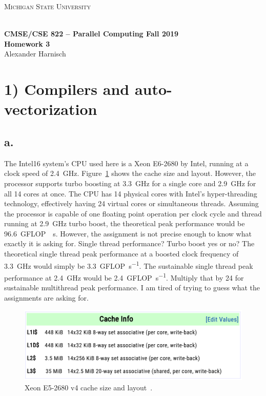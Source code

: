 \documentclass[a4paper, 11pt]{article}
\begin{document}
\noindent
\centerline{\small{\textsc{Michigan State University}}} \\
\large{\textbf{CMSE/CSE 822 – Parallel Computing \hfill Fall 2019 \\
Homework 3}} \\
Alexander Harnisch \\
\noindent\makebox[\linewidth]{\rule{\textwidth}{0.4pt}}

\section*{1) Compilers and auto-vectorization}
\subsection*{a.}
\label{sec:1a}
The Intel16 system's CPU used here is a Xeon E6-2680 by Intel, running at a
clock speed of \SI{2.4}{\giga\hertz}. Figure~\ref{fig:cache_table} shows the
cache size and layout. However, the processor supports turbo boosting at
\SI{3.3}{\giga\hertz} for a single core and \SI{2.9}{\giga\hertz} for all 14
cores at once. The CPU has 14 physical cores with Intel's hyper-threading
technology, effectively having 24 virtual cores or simultaneous threads.
Assuming the processor is capable of one floating point operation per clock
cycle and thread running at \SI{2.9}{\giga\hertz} turbo boost, the theoretical
peak performance would be \SI{96.6}{\giga FLOP \per\second}. However, the
assignment is not precise enough to know what exactly it is asking for. Single
thread performance? Turbo boost yes or no? The theoretical single thread peak
performance at a boosted clock frequency of \SI{3.3}{\giga\hertz} would simply
be \SI{3.3}{\giga FLOP\per\second}. The sustainable single thread peak
performance at \SI{2.4}{\giga\hertz} would be \SI{2.4}{\giga FLOP\per\second}.
Multiply that by 24 for sustainable multithread peak performance. I am tired of
trying to guess what the assignments are asking for.
\begin{figure}
  \centering
  \includegraphics[width=.7\textwidth]{./cache_table.png}
  \caption{Xeon E5-2680 v4 cache size and layout~\cite{wikichip}.}
  \label{fig:cache_table}
\end{figure}
\end{document}
